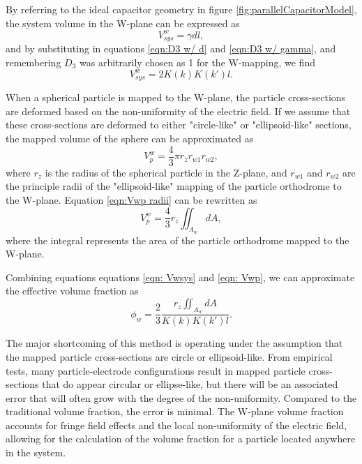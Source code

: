 \par By referring to the ideal capacitor geometry in figure \ref{fig:parallelCapacitorModel}, the system volume in the W-plane can be expressed as 
\begin{equation}
    V^w_{sys} = \gamma d l,    
\end{equation}
\noindent and by substituting in equations \ref{eqn:D3 w/ d} and \ref{eqn:D3 w/ gamma}, and remembering $D_3$ was arbitrarily chosen as 1 for the W-mapping, we find
\begin{equation}
    V^w_{sys} = 2K(k)K(k')l.
    \label{eqn: Vwsys}
\end{equation}
\par When a spherical particle is mapped to the W-plane, the particle cross-sections are deformed based on the non-uniformity of the electric field. If we assume that these cross-sections are deformed to either "circle-like" or "ellipsoid-like" sections, the mapped volume of the sphere can be approximated as 
\begin{equation}
    V^w_p = \frac{4}{3}\pi r_z r_{w1} r_{w2},
    \label{eqn:Vwp radii}
\end{equation}
\noindent where $r_z$ is the radius of the spherical particle in the Z-plane, and $r_{w1}$ and $r_{w2}$ are the principle radii of the "ellipsoid-like" mapping of the particle orthodrome to the W-plane. Equation \ref{eqn:Vwp radii} can be rewritten as 
\begin{equation}
    V^w_p = \frac{4}{3} r_z \iint_{A_w} dA,
    \label{eqn: Vwp}
\end{equation}
\noindent where the integral represents the area of the particle orthodrome mapped to the W-plane. 

\par Combining equations equations \ref{eqn: Vwsys} and \ref{eqn: Vwp}, we can approximate the effective volume fraction as
\begin{equation}
    \phi_w = \frac{2}{3} \frac{r_z \iint_{A_w} dA}{K(k)K(k')l}.
\end{equation}

\par The major shortcoming of this method is operating under the assumption that the mapped particle cross-sections are circle or ellipsoid-like. From empirical tests, many particle-electrode configurations result in mapped particle cross-sections that do appear circular or ellipse-like, but there will be an associated error that will often grow with the degree of the non-uniformity. Compared to the traditional volume fraction, the error is minimal. The W-plane volume fraction accounts for fringe field effects and the local non-uniformity of the electric field, allowing for the calculation of the volume fraction for a particle located anywhere in the system. 

